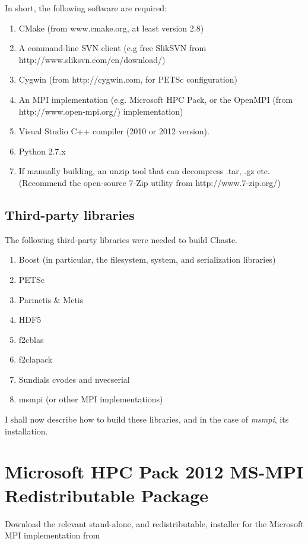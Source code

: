 \documentclass[10pt,a4paper]{article}
\begin{document}
In short, the following software are required:
\begin{enumerate}
\item CMake (from www.cmake.org, at least version 2.8)
\item A command-line SVN client (e.g free SlikSVN from
http://www.sliksvn.com/en/download/)
\item Cygwin (from http://cygwin.com, for PETSc configuration)
\item An MPI implementation (e.g. Microsoft HPC Pack, or the OpenMPI (from
http://www.open-mpi.org/) implementation)
\item Visual Studio C++ compiler (2010 or 2012 version).
\item Python 2.7.x 
\item If manually building, an unzip tool that can decompress .tar, .gz etc.
(Recommend the open-source 7-Zip utility from http://www.7-zip.org/)
\end{enumerate}

\subsection{Third-party libraries}
The following third-party libraries were needed to build Chaste.
\begin{enumerate}
\item Boost (in particular, the filesystem, system, and serialization libraries)
\item PETSc
\item Parmetis \& Metis
\item HDF5
\item f2cblas
\item f2clapack
\item Sundials cvodes and nvecserial
\item msmpi (or other MPI implementations)
\end{enumerate}

I shall now describe how to build these libraries, and in the case of
\textit{msmpi}, its installation.

\section{Microsoft HPC Pack 2012 MS-MPI Redistributable Package}

Download the relevant stand-alone, and redistributable, installer for the
Microsoft MPI implementation
from

\begin{center}
\end{center}
\end{document}

